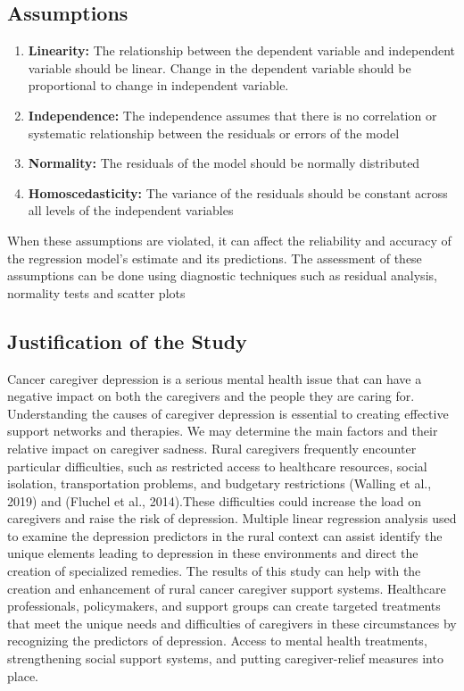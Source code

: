 \documentclass[11pt]{article}\usepackage[]{graphicx}\usepackage[]{xcolor}
\numberwithin{equation}{section}
\numberwithin{table}{section}
\begin{document}
\subsection{Assumptions}
\begin{enumerate}
\item\textbf{ Linearity:} The relationship between the dependent variable and independent variable should be linear. Change in the dependent variable should be proportional to change in independent variable.
\item \textbf{Independence:} The independence assumes that there is no correlation or systematic relationship between the residuals or errors of the model
\item \textbf{Normality:} The residuals of the model should be normally distributed
\item \textbf{Homoscedasticity:} The variance of the residuals should be constant across all levels of the independent variables
\end{enumerate}
When these assumptions are violated, it can affect the reliability and accuracy of the regression model's estimate and its predictions. The assessment of these assumptions can be done using diagnostic techniques such as residual analysis, normality tests and scatter plots

\subsection{Justification of the Study}
Cancer caregiver depression is a serious mental health issue that can have a negative impact on both the caregivers and the people they are caring for. Understanding the causes of caregiver depression is essential to creating effective support networks and therapies. We may determine the main factors and their relative impact on caregiver sadness. Rural caregivers frequently encounter particular difficulties, such as restricted access to healthcare resources, social isolation, transportation problems, and budgetary restrictions (Walling et al., 2019) and (Fluchel et al., 2014).These difficulties could increase the load on caregivers and raise the risk of depression. Multiple linear regression analysis used to examine the depression predictors in the rural context can assist identify the unique elements leading to depression in these environments and direct the creation of specialized remedies. The results of this study can help with the creation and enhancement of rural cancer caregiver support systems. Healthcare professionals, policymakers, and support groups can create targeted treatments that meet the unique needs and difficulties of caregivers in these circumstances by recognizing the predictors of depression. Access to mental health treatments, strengthening social support systems, and putting caregiver-relief measures into place.
\end{document}
